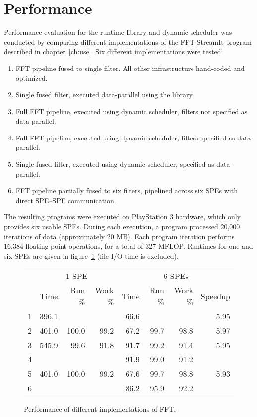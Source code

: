 \section{Performance}\label{ch:perf}

Performance evaluation for the runtime library and dynamic scheduler was conducted by comparing different implementations of the FFT StreamIt program described in chapter~\ref{ch:use}. Six different implementations were tested:
\begin{enumerate}
\item FFT pipeline fused to single filter. All other infrastructure hand-coded and optimized.
\item Single fused filter, executed data-parallel using the library.
\item Full FFT pipeline, executed using dynamic scheduler, filters not specified as data-parallel.
\item Full FFT pipeline, executed using dynamic scheduler, filters specified as data-parallel.
\item Single fused filter, executed using dynamic scheduler, specified as data-parallel.
\item FFT pipeline partially fused to six filters, pipelined across six SPEs with direct SPE--SPE communication.
\end{enumerate}

The resulting programs were executed on PlayStation 3 hardware, which only provides six usable SPEs. During each execution, a program processed 20,000 iterations of data (approximately 20 MB). Each program iteration performs 16,384 floating point operations, for a total of 327 MFLOP. Runtimes for one and six SPEs are given in figure~\ref{fig:perf:fft} (file I/O time is excluded).

\begin{figure}[!htb]
\begin{center}
\begin{tabular}{|r|r|r|r|r|r|r|r|}
\hline
& \multicolumn{3}{|c|}{1 SPE} & \multicolumn{4}{|c|}{6 SPEs} \\
\cline{2-8}
& Time & Run \% & Work \% & Time & Run \% & Work \% & Speedup \\
\hline
\textsf{1} & 396.1 & \multicolumn{2}{|c|}{} & 66.6 & \multicolumn{2}{|c|}{} & 5.95 \\
\hline
\textsf{2} & 401.0 & 100.0 & 99.2 & 67.2 & 99.7 & 98.8 & 5.97 \\
\hline
\textsf{3} & 545.9 & 99.6 & 91.8 & 91.7 & 99.2 & 91.4 & 5.95 \\
\hline
\textsf{4} & \multicolumn{3}{|c|}{} & 91.9 & 99.0 & 91.2 & \\
\hline
\textsf{5} & 401.0 & 100.0 & 99.2 & 67.6 & 99.7 & 98.8 & 5.93 \\
\hline
\textsf{6} & \multicolumn{3}{|c|}{} & 86.2 & 95.9 & 92.2 & \\
\hline
\end{tabular}
\end{center}
\caption{Performance of different implementations of FFT.}
\label{fig:perf:fft}
\end{figure}

